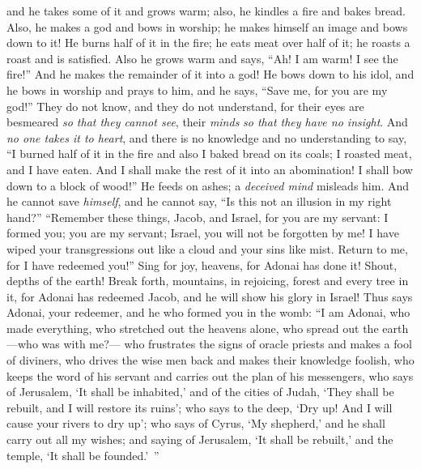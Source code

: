 \begin{biblechapter}
and he takes some of it and grows warm; 
also, he kindles a fire and bakes bread. 
Also, he makes a god and bows in worship; 
he makes himself an image and bows down to it!
\verse He burns half of it in the fire; 
he eats meat over half of it; 
he roasts a roast and is satisfied. 
Also he grows warm and says, “Ah! 
I am warm! I see the fire!”
\verse And he makes the remainder of it into a god! 
He bows down to his idol, 
and he bows in worship and prays to him, 
and he says, “Save me, for you are my god!”
\verse They do not know, 
and they do not understand, 
for their eyes are besmeared \textit{so that they cannot see}, 
their \textit{minds} \textit{so that they have no insight}.
\verse And \textit{no one takes it to heart}, and there is no knowledge 
and no understanding to say, “I burned half of it in the fire 
and also I baked bread on its coals; 
I roasted meat, and I have eaten. 
And I shall make the rest of it into an abomination! 
I shall bow down to a block of wood!”
\verse He feeds on ashes; a \textit{deceived mind} misleads him. 
And he cannot save \textit{himself}, and he cannot say, 
“Is this not an illusion in my right hand?”
 “Remember these things, Jacob, 
and Israel, for you are my servant: 
I formed you; you are my servant; 
Israel, you will not be forgotten by me!
\verse I have wiped your transgressions out like a cloud 
and your sins like mist. 
Return to me, 
for I have redeemed you!”
\verse Sing for joy, heavens, for Adonai has done it! 
Shout, depths of the earth! 
Break forth, mountains, in rejoicing, 
forest and every tree in it, 
for Adonai has redeemed Jacob, 
and he will show his glory in Israel!
 Thus says Adonai, your redeemer, 
and he who formed you in the womb: 
“I am Adonai, who made everything, 
who stretched out the heavens alone, 
who spread out the earth—who was with me?—
\verse who frustrates the signs of oracle priests 
and makes a fool of diviners, 
who drives the wise men back 
and makes their knowledge foolish,
\verse who keeps the word of his servant 
and carries out the plan of his messengers, 
who says of Jerusalem, ‘It shall be inhabited,’ 
and of the cities of Judah, ‘They shall be rebuilt, 
and I will restore its ruins’;
\verse who says to the deep, ‘Dry up! 
And I will cause your rivers to dry up’;
\verse who says of Cyrus, ‘My shepherd,’ 
and he shall carry out all my wishes; 
and saying of Jerusalem, ‘It shall be rebuilt,’ 
and the temple, ‘It shall be founded.’ ”
\end{biblechapter}

